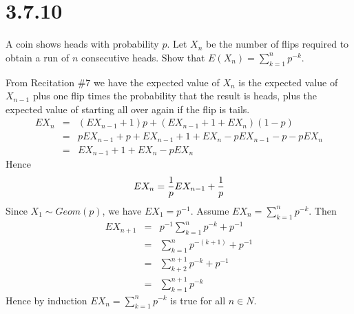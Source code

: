 \section*{3.7.10}
A coin shows heads with probability $p$.
Let $X_n$ be the number of flips required to obtain a run of $n$
consecutive heads.
Show that $E(X_n)=\sum_{k=1}^np^{-k}$.

\bigskip
\noindent
From Recitation \#7 we have the expected value of $X_n$ is
the expected value of $X_{n-1}$ plus one flip times the probability
that the result is heads, plus the expected value of starting all
over again if the flip is tails.
\begin{eqnarray*}
EX_n&=&(EX_{n-1}+1)p+(EX_{n-1}+1+EX_n)(1-p)\\
&=&pEX_{n-1}+p+EX_{n-1}+1+EX_n-pEX_{n-1}-p-pEX_n\\
&=&EX_{n-1}+1+EX_n-pEX_n
\end{eqnarray*}
Hence
$$EX_n={1\over p}EX_{n-1}+{1\over p}$$
Since $X_1\sim Geom(p)$, we have $EX_1=p^{-1}$.
Assume $EX_n=\sum_{k=1}^np^{-k}$.
Then
\begin{eqnarray*}
EX_{n+1}&=&p^{-1}\sum_{k=1}^np^{-k}+p^{-1}\\
&=&\sum_{k=1}^np^{-(k+1)}+p^{-1}\\
&=&\sum_{k+2}^{n+1}p^{-k}+p^{-1}\\
&=&\sum_{k=1}^{n+1}p^{-k}
\end{eqnarray*}
Hence by induction $EX_n=\sum_{k=1}^np^{-k}$ is true for all
$n\in N$.

